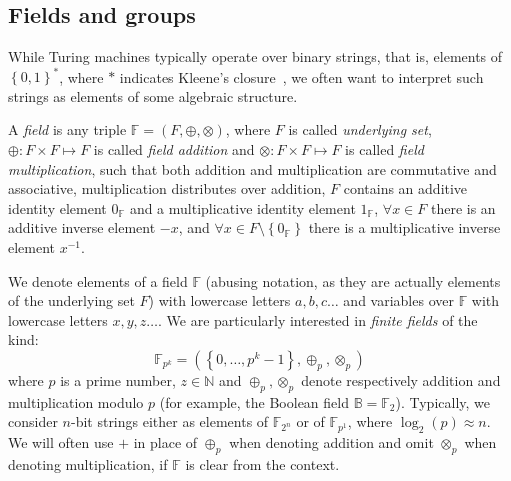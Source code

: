 \subsection{Fields and groups}
While Turing machines typically operate over binary strings, that is, elements of
\({\left\{0, 1\right\}}^*\), where \(*\) indicates Kleene's closure~\cite{DrosteK2009}, we often 
want to interpret such strings as elements of some algebraic structure.
\begin{definition}
	A \emph{field} is any triple \(\mathbb{F} = \left(F, \oplus, \otimes\right)\), where \(F\) is
	called \emph{underlying set}, \(\oplus\colon F \times F \mapsto F\) is called
	\emph{field addition} and \(\otimes\colon F \times F \mapsto F\) is called
	\emph{field multiplication}, such that both addition and multiplication are commutative and
	associative, multiplication distributes over addition, \(F\) contains an additive identity
	element \(0_{\mathbb{F}}\) and a multiplicative identity element \(1_{\mathbb{F}}\),
	\(\forall x \in F\) there is an additive inverse element \(-x\), and
	\(\forall x \in F\setminus \left\{0_{\mathbb{F}}\right\} \) there is a multiplicative inverse
	element \(x^{-1}\).
\end{definition}

\noindent We denote elements of a field \(\mathbb{F}\) (abusing notation, as they are actually
elements of the underlying set \(F\)) with lowercase letters \(a, b, c\dots \) and variables over
\(\mathbb{F}\) with lowercase letters \(x, y, z\dots \).
We are particularly interested in \emph{finite fields} of the kind:
\[\mathbb{F}_{p^k} = \left(\left\{0, \dots, p^k-1\right\}, \oplus_p, \otimes_p\right)\]
where \(p\) is a prime number, \(z \in \mathbb{N}\) and \(\oplus_p, \otimes_p\) denote respectively 
addition and multiplication modulo \(p\) (for example, the Boolean field \(\mathbb{B} = \mathbb{F}_2\)).
Typically, we consider \(n\)-bit strings either as elements of \(\mathbb{F}_{2^n}\) or of
\(\mathbb{F}_{p^1}\), where \(\log_2\left(p\right) \approx n\).
We will often use \(+\) in place of \(\oplus_p \) when denoting addition and omit \(\otimes_p \)
when denoting multiplication, if \(\mathbb{F}\) is clear from the context.


